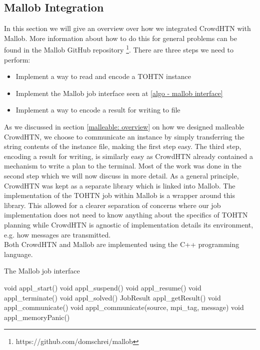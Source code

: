 \subsection{Mallob Integration}
\label{impl: mallob integration}
In this section we will give an overview over how we integrated CrowdHTN with Mallob. More information about how to do this for general problems can be found in the Mallob GitHub repository \footnote{https://github.com/domschrei/mallob}. There are three steps we need to perform:
\begin{itemize}
	\item Implement a way to read and encode a TOHTN instance
	\item Implement the Mallob job interface seen at \ref{algo - mallob interface}
	\item Implement a way to encode a result for writing to file
\end{itemize}
As we discussed in section \ref{malleable: overview} on how we designed malleable CrowdHTN, we choose to communicate an instance by simply transferring the string contents of the instance file, making the first step easy. The third step, encoding a result for writing, is similarly easy as CrowdHTN already contained a mechanism to write a plan to the terminal. Most of the work was done in the second step which we will now discuss in more detail. As a general principle, CrowdHTN was kept as a separate library which is linked into Mallob. The implementation of the TOHTN job within Mallob is a wrapper around this library. This allowed for a clearer separation of concerns where our job implementation does not need to know anything about the specifics of TOHTN planning while CrowdHTN is agnostic of implementation details its environment, e.g. how messages are transmitted.\\
Both CrowdHTN and Mallob are implemented using the C++ programming language.
\begin{algorithm}
	\caption{The Mallob job interface}
	\label{algo - mallob interface}
	void appl\_start()\;
	void appl\_suspend()\;
	void appl\_resume()\;
	void appl\_terminate()\;
	void appl\_solved()\;
	JobResult appl\_getResult()\;
	void appl\_communicate()\;
	void appl\_communicate(source, mpi\_tag, message)\;
	void appl\_memoryPanic()\;
\end{algorithm}

